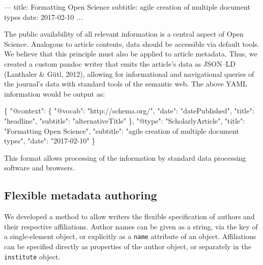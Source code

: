 \documentclass[10pt,fleqn]{wlpeerj}
\newenvironment{Shaded}{}{}
\newcommand{\DataTypeTok}[1]{\textcolor[rgb]{0.56,0.13,0.00}{{#1}}}
\newcommand{\StringTok}[1]{\textcolor[rgb]{0.25,0.44,0.63}{{#1}}}
\newcommand{\CommentTok}[1]{\textcolor[rgb]{0.38,0.63,0.69}{\textit{{#1}}}}
\newcommand{\OtherTok}[1]{\textcolor[rgb]{0.00,0.44,0.13}{{#1}}}
\newcommand{\FunctionTok}[1]{\textcolor[rgb]{0.02,0.16,0.49}{{#1}}}
\newcommand{\NormalTok}[1]{{#1}}
\begin{document}
\newpage

\begin{Shaded}
\begin{Highlighting}[]
\OtherTok{---}
\FunctionTok{title:} \NormalTok{Formatting Open Science}
\FunctionTok{subtitle:} \NormalTok{agile creation of multiple document types}
\FunctionTok{date:} \NormalTok{2017-02-10}
\CommentTok{...}
\end{Highlighting}
\end{Shaded}

The public availability of all relevant information is a central aspect
of Open Science. Analogous to article contents, data should be
accessible via default tools. We believe that this principle must also
be applied to article metadata. Thus, we created a custom pandoc writer
that emits the article's data as JSON--LD (Lanthaler \& Gütl, 2012),
allowing for informational and navigational queries of the journal's
data with standard tools of the semantic web. The above YAML information
would be output as:

\begin{Shaded}
\begin{Highlighting}[]
\FunctionTok{\{}
  \DataTypeTok{"@context"}\FunctionTok{:} \FunctionTok{\{}
    \DataTypeTok{"@vocab"}\FunctionTok{:} \StringTok{"http://schema.org/"}\FunctionTok{,}
    \DataTypeTok{"date"}\FunctionTok{:} \StringTok{"datePublished"}\FunctionTok{,}
    \DataTypeTok{"title"}\FunctionTok{:} \StringTok{"headline"}\FunctionTok{,}
    \DataTypeTok{"subtitle"}\FunctionTok{:} \StringTok{"alternativeTitle"}
  \FunctionTok{\},}
  \DataTypeTok{"@type"}\FunctionTok{:} \StringTok{"ScholarlyArticle"}\FunctionTok{,}
  \DataTypeTok{"title"}\FunctionTok{:} \StringTok{"Formatting Open Science"}\FunctionTok{,}
  \DataTypeTok{"subtitle"}\FunctionTok{:} \StringTok{"agile creation of multiple document types"}\FunctionTok{,}
  \DataTypeTok{"date"}\FunctionTok{:} \StringTok{"2017-02-10"}
\FunctionTok{\}}
\end{Highlighting}
\end{Shaded}

This format allows processing of the information by standard data
processing software and browsers.

\subsection{Flexible metadata
authoring}\label{flexible-metadata-authoring}

We developed a method to allow writers the flexible specification of
authors and their respective affiliations. Author names can be given as
a string, via the key of a single-element object, or explicitly as a
\texttt{name} attribute of an object. Affiliations can be specified
directly as properties of the author object, or separately in the
\texttt{institute} object.
\end{document}
